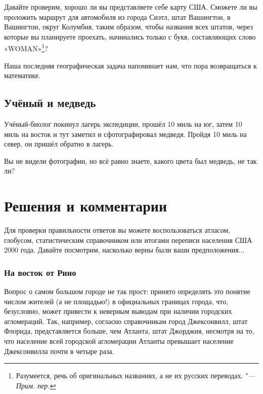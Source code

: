 \documentclass[twoside]{book}
\makeatletter
\newcommand{\rindex}[2][\imki@jobname]{%
\index[#1]{\detokenize{#2}}%
}
\makeatother
\begin{document}
Давайте проверим, хорошо ли вы представляете себе карту США. Сможете
ли вы проложить маршрут для автомобиля из города Сиэтл, штат
Вашингтон, в Вашингтон, округ Колумбия, таким образом, чтобы названия
всех штатов, через которые вы планируете проехать, начинались только с
букв, составляющих слово «WOMAN»\footnote{Разумеется, речь об оригинальных названиях, а не их русских переводах. "---
\emph{Прим. пер.}}?


\medskip

Наша последняя географическая задача напоминает нам, что пора возвращаться к математике. %

\subsection*{Учёный и медведь}%
\rindex{Учёный и медведь}

Учёный-биолог покинул лагерь экспедиции, прошёл 10 миль на юг, затем 10 миль на восток и тут заметил и сфотографировал медведя.
Пройдя 10 миль на север, он пришёл обратно в лагерь.

\medskip

Вы не видели фотографии, но всё равно знаете, какого цвета был медведь, не так ли?


\section*{Решения и комментарии}

Для проверки правильности ответов вы можете воспользоваться атласом,
глобусом, статистическим справочником или итогами переписи населения США 2000 года.
Давайте посмотрим, насколько верны были ваши предположения...

\subsubsection*{На восток от Рино}%

Вопрос о самом большом городе не так прост: 
принято определять это понятие числом жителей (а не площадью!) в официальных границах города, что, безусловно, может привести к неверным выводам
при наличии городских агломераций.
Так, например, согласно справочникам город Джексонвилл, штат Флорида, представляется больше, чем Атланта, штат Джорджия, несмотря на то, что население всей городской агломерации Атланты превышает население Джексонвилла почти в четыре раза.
\end{document}
